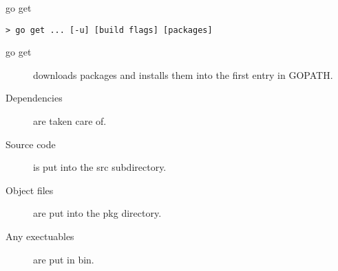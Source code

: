 \begin{frame}[fragile]{go get}
  \begin{verbatim}
> go get ... [-u] [build flags] [packages]
  \end{verbatim}
  \hr
\begin{description}
    \item[go get] downloads packages and installs them into the first entry in GOPATH.
    \item[Dependencies] are taken care of.
    \item[Source code] is put into the src subdirectory.
    \item[Object files] are put into the pkg directory.
    \item[Any exectuables] are put in bin.
  \end{description}
  
\end{frame}
